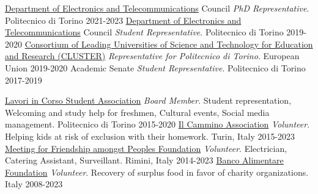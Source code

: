 
\begin{cvhonors}
  \cvhonor
    {\href{https://www.det.polito.it/}{Department of Electronics and Telecommunications} Council} %
    {\textit{PhD Representative}.} %
    {Politecnico di Torino} %
    {2021-2023} %
  \cvhonor
    {\href{https://www.det.polito.it/}{Department of Electronics and Telecommunications} Council} %
    {\textit{Student Representative}.} %
    {Politecnico di Torino} %
    {2019-2020} %
  \cvhonor
    {\href{https://cluster.org/}{Consortium of Leading Universities of Science and Technology for Education and Research (CLUSTER)}} %
    {\textit{Representative for Politecnico di Torino}.} %
    {European Union} %
    {2019-2020} %
  \cvhonor
    {Academic Senate} %
    {\textit{Student Representative}.} %
    {Politecnico di Torino} %
    {2017-2019} %
\end{cvhonors}

\newpage

\begin{cvhonors}
  \cvhonor
    {\href{https://www.instagram.com/lavorincorso_os_polito/}{Lavori in Corso Student Association}} %
    {\textit{Board Member}. Student representation, Welcoming and study help for freshmen, Cultural events, Social media management.} %
    {Politecnico di Torino} %
    {2015-2020} %
  \cvhonor
    {\href{http://www.associazioneilcammino.it/}{Il Cammino Association}} %
    {\textit{Volunteer}. Helping kids at risk of exclusion with their homework.} %
    {Turin, Italy} %
    {2015-2023} %
  \cvhonor
    {\href{https://www.meetingrimini.org/}{Meeting for Friendship amongst Peoples Foundation}} %
    {\textit{Volunteer}. Electrician, Catering Assistant, Surveillant.} %
    {Rimini, Italy} %
    {2014-2023} %
  \cvhonor
    {\href{https://www.bancoalimentare.it/en}{Banco Alimentare Foundation}} %
    {\textit{Volunteer}. Recovery of surplus food in favor of charity organizations.} %
    {Italy} %
    {2008-2023} %
\end{cvhonors}
